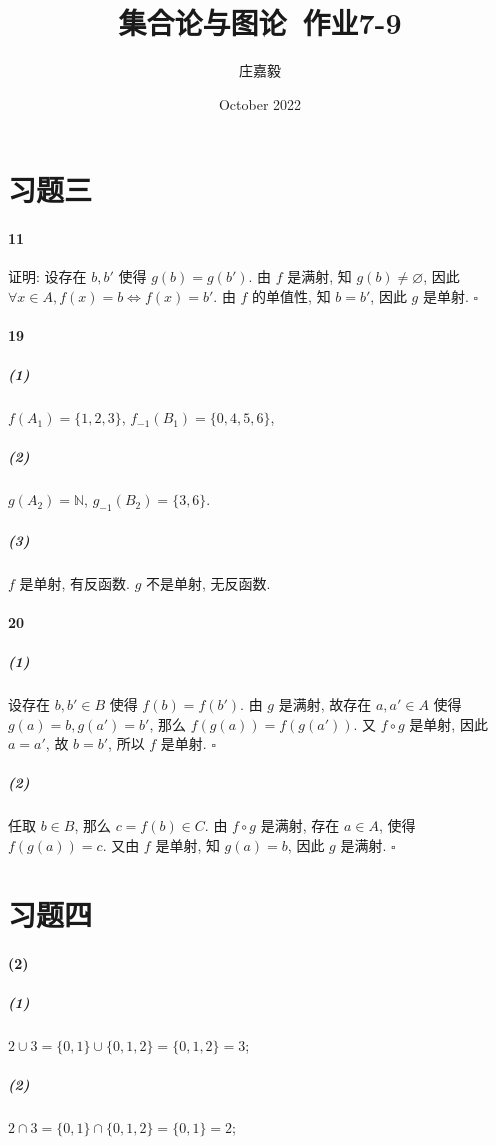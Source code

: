 \documentclass{ctexart}
\title{集合论与图论~作业7-9}
\author{庄嘉毅}
\date{October 2022}
\def\QED{\hfill $\square$}
\def\equ{\mathrel{\Leftrightarrow}}
\begin{document}
\maketitle

\section*{习题三}

\paragraph*{11} 证明: 设存在 $b,b'$ 使得 $g(b)=g(b')$.
由 $f$ 是满射, 知 $g(b)\ne \varnothing$, 因此
$\forall x\in A, f(x)=b \equ f(x)=b'$. 由 $f$ 的单值性,
知 $b=b'$, 因此 $g$ 是单射. \QED

\paragraph*{19}

\subparagraph*{(1)} $f(A_1)=\{1,2,3\}$,
$f_{-1}(B_1)=\{0, 4, 5, 6\}$,

\subparagraph*{(2)} $g(A_2)=\mathbb{N}$,
$g_{-1}(B_2)=\{3,6\}$.

\subparagraph*{(3)} $f$ 是单射, 有反函数. $g$ 不是单射, 无反函数.

\paragraph*{20}

\subparagraph*{(1)} 设存在 $b, b'\in B$ 使得 $f(b)=f(b')$.
由 $g$ 是满射, 故存在 $a,a'\in A$ 使得 $g(a)=b, g(a')=b'$,
那么 $f(g(a))=f(g(a'))$.
又 $f\circ g$ 是单射, 因此 $a=a'$, 故 $b=b'$, 所以 $f$ 是单射. \QED

\subparagraph*{(2)} 任取 $b\in B$, 那么 $c=f(b)\in C$.
由 $f\circ g$ 是满射, 存在 $a\in A$, 使得 $f(g(a))=c$.
又由 $f$ 是单射, 知 $g(a)=b$, 因此 $g$ 是满射. \QED

\section*{习题四}

\paragraph*{(2)}

\subparagraph*{(1)} $2\cup 3=\{0,1\}\cup \{0,1,2\}=\{0,1,2\}=3$;

\subparagraph*{(2)} $2\cap 3=\{0,1\}\cap \{0,1,2\}=\{0,1\}=2$;
\end{document}
